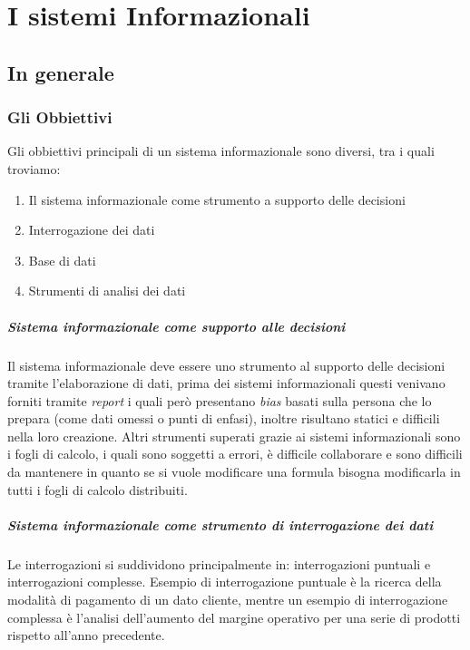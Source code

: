 \chapter{I sistemi Informazionali}
\thispagestyle{chapterInit}
\section{In generale}
    \subsection{Gli Obbiettivi}
        Gli obbiettivi principali di un sistema informazionale sono diversi, tra i quali troviamo:
        \begin{enumerate}
            \item Il sistema informazionale come strumento a supporto delle decisioni
            \item Interrogazione dei dati
            \item Base di dati
            \item Strumenti di analisi dei dati
        \end{enumerate}
        \paragraph{Sistema informazionale come supporto alle decisioni} Il sistema informazionale deve essere uno strumento al supporto delle decisioni tramite l'elaborazione di dati, prima dei sistemi informazionali questi venivano forniti tramite \textit{report} i quali però presentano \textit{bias} basati sulla persona che lo prepara (come dati omessi o punti di enfasi), inoltre risultano statici e difficili nella loro creazione. Altri strumenti superati grazie ai sistemi informazionali sono i fogli di calcolo, i quali sono soggetti a errori, è difficile collaborare e sono difficili da mantenere in quanto se si vuole modificare una formula bisogna modificarla in tutti i fogli di calcolo distribuiti.
        \paragraph{Sistema informazionale come strumento di interrogazione dei dati} Le interrogazioni si suddividono principalmente in: interrogazioni puntuali e interrogazioni complesse. Esempio di interrogazione puntuale è la ricerca della modalità di pagamento di un dato cliente, mentre un esempio di interrogazione complessa è l'analisi dell'aumento del margine operativo per una serie di prodotti rispetto all'anno precedente.
